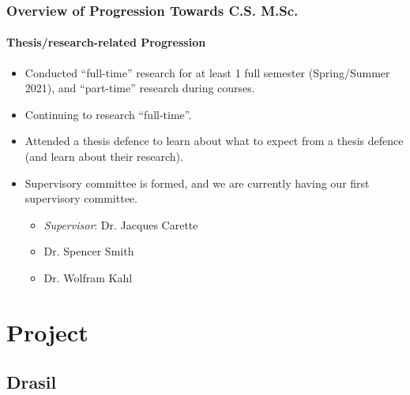 \documentclass{beamer}
\begin{document}
\begin{frame}
    \frametitle{Overview of Progression Towards C.S. M.Sc.}
    \framesubtitle{Thesis/research-related Progression}
    \begin{itemize}
        \item<1-> Conducted ``full-time'' research for at least 1 full semester (Spring/Summer 2021), and ``part-time'' research during courses.
        \item<2-> Continuing to research ``full-time''.
        \item<3-> Attended a thesis defence to learn about what to expect from a thesis defence (and learn about their research).
        \item<4-> Supervisory committee is formed, and we are currently having our first supervisory committee.
            \begin{itemize}
                \item \emph{Supervisor}: Dr. Jacques Carette
                \item Dr. Spencer Smith
                \item Dr. Wolfram Kahl
            \end{itemize}
    \end{itemize}
\end{frame}


\section{Project}
\subsection{Drasil}
\end{document}
